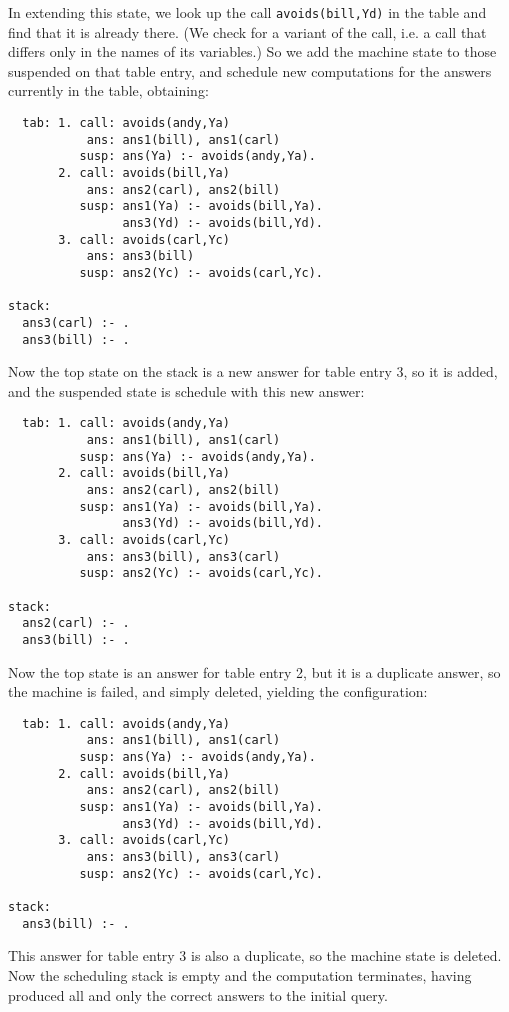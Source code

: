 In extending this state, we look up the call \verb|avoids(bill,Yd)| in
the table and find that it is already there.  (We check for a variant
of the call, i.e. a call that differs only in the names of its
variables.)  So we add the machine state to those suspended on that
table entry, and schedule new computations for the answers currently
in the table, obtaining:
\begin{verbatim}
  tab: 1. call: avoids(andy,Ya)
           ans: ans1(bill), ans1(carl)
          susp: ans(Ya) :- avoids(andy,Ya).
       2. call: avoids(bill,Ya)
           ans: ans2(carl), ans2(bill)
          susp: ans1(Ya) :- avoids(bill,Ya).
                ans3(Yd) :- avoids(bill,Yd).
       3. call: avoids(carl,Yc)
           ans: ans3(bill)
          susp: ans2(Yc) :- avoids(carl,Yc).

stack:
  ans3(carl) :- .
  ans3(bill) :- .
\end{verbatim}
Now the top state on the stack is a new answer for table entry 3, so
it is added, and the suspended state is schedule with this new answer:
\begin{verbatim}
  tab: 1. call: avoids(andy,Ya)
           ans: ans1(bill), ans1(carl)
          susp: ans(Ya) :- avoids(andy,Ya).
       2. call: avoids(bill,Ya)
           ans: ans2(carl), ans2(bill)
          susp: ans1(Ya) :- avoids(bill,Ya).
                ans3(Yd) :- avoids(bill,Yd).
       3. call: avoids(carl,Yc)
           ans: ans3(bill), ans3(carl)
          susp: ans2(Yc) :- avoids(carl,Yc).

stack:
  ans2(carl) :- .
  ans3(bill) :- .
\end{verbatim}
Now the top state is an answer for table entry 2, but it is a
duplicate answer, so the machine is failed, and simply deleted,
yielding the configuration:
\begin{verbatim}
  tab: 1. call: avoids(andy,Ya)
           ans: ans1(bill), ans1(carl)
          susp: ans(Ya) :- avoids(andy,Ya).
       2. call: avoids(bill,Ya)
           ans: ans2(carl), ans2(bill)
          susp: ans1(Ya) :- avoids(bill,Ya).
                ans3(Yd) :- avoids(bill,Yd).
       3. call: avoids(carl,Yc)
           ans: ans3(bill), ans3(carl)
          susp: ans2(Yc) :- avoids(carl,Yc).

stack:
  ans3(bill) :- .
\end{verbatim}
This answer for table entry 3 is also a duplicate, so the machine
state is deleted.  Now the scheduling stack is empty and the
computation terminates, having produced all and only the correct
answers to the initial query.
